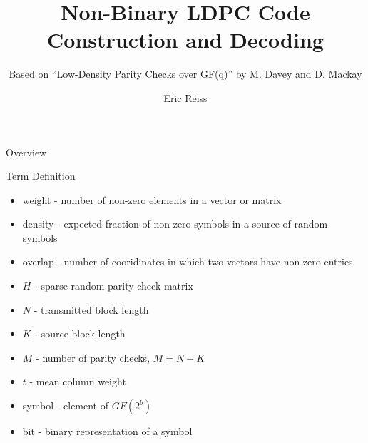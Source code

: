 \documentclass[10pt,ignorenonframetext,]{beamer}
\title{Non-Binary LDPC Code Construction and Decoding}
\subtitle{Based on ``Low-Density Parity Checks over GF(q)'' by M. Davey
and D. Mackay}
\author{Eric Reiss}
\date{}
\providecommand{\tightlist}{%
  \setlength{\itemsep}{0pt}\setlength{\parskip}{0pt}}
\begin{document}
\frame{\titlepage}

\begin{frame}{Overview}
\protect\hypertarget{overview}{}
\end{frame}

\begin{frame}{Term Definition}
\protect\hypertarget{term-definition}{}
\begin{itemize}[<+->]
\tightlist
\item
  weight - number of non-zero elements in a vector or matrix
\item
  density - expected fraction of non-zero symbols in a source of random
  symbols
\item
  overlap - number of cooridinates in which two vectors have non-zero
  entries
\item
  \(H\) - sparse random parity check matrix
\item
  \(N\) - transmitted block length
\item
  \(K\) - source block length
\item
  \(M\) - number of parity checks, \(M=N-K\)
\item
  \(t\) - mean column weight
\item
  symbol - element of \(GF(2^b)\)
\item
  bit - binary representation of a symbol
\end{itemize}
\end{frame}
\end{document}

